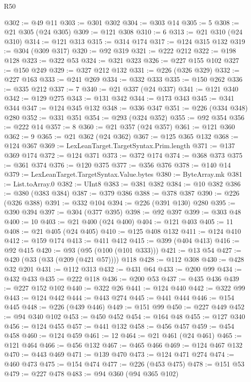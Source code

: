 \begin{lexlean}{R50}
\begin{coremodule}
@302 := @49 @11
@303 := @301 @302
@304 := @303 @14
@305 := 5
@308 := @21 @305 (@24 @305)
@309 := @121 @308
@310 := 6
@313 := @21 @310 (@24 @310)
@314 := @121 @313
@315 := @314 @174
@317 := @124 @315 @132
@319 := @304 (@309 @317)
@320 := @92 @319
@321 := @222 @212
@322 := @198 @128
@323 := @322 @53
@324 := @321 @323
@326 := @227 @155 @102
@327 := @150 @249
@329 := @327 @212 @132
@331 := @226 (@326 @329)
@332 := @227 @163
@333 := @241 @269
@334 := @332 @333
@335 := @150 @262
@336 := @335 @212
@337 := 7
@340 := @21 @337 (@24 @337)
@341 := @121 @340
@342 := @129 @275
@343 := @131 @342
@344 := @173 @343
@345 := @341 @344
@347 := @124 @345 @132
@348 := @336 @347
@351 := @226 (@334 @348) @280
@352 := @331 @351
@354 := @293 (@324 @352)
@355 := @92 @354
@356 := @222 @14
@357 := 8
@360 := @21 @357 (@24 @357)
@361 := @121 @360
@362 := 9
@365 := @21 @362 (@24 @362)
@367 := @125 @365 @132
@368 := @124 @367
@369 := LexLeanTarget.TargetSyntax.Prim.length
@371 := @137 @369 @174
@372 := @124 @371
@373 := @372 @174
@374 := @368 @373
@375 := @361 @374
@376 := @120 @375
@377 := @356 @376
@378 := @140 @14
@379 := LexLeanTarget.TargetSyntax.Value.bytes
@380 := ByteArray.mk
@381 := List.toArray.{0}
@382 := UInt8
@383 := @381 @382
@384 := @10 @382
@386 := @380 (@383 @384)
@387 := @379 @386
@388 := @378 @387
@390 := @226 (@326 @388)
@391 := @332 @104
@394 := @226 (@391 @130) @280
@395 := @390 @394
@397 := @304 (@377 @395)
@398 := @92 @397
@399 := @303 @48
@400 := 10
@403 := @21 @400 (@24 @400)
@404 := @121 @403
@405 := 11
@408 := @21 @405 (@24 @405)
@410 := @125 @408 @132
@411 := @124 @410
@412 := @159 @174
@413 := @411 @412
@415 := @399 (@404 @413)
@416 := @92 @415
@420 := @93 (@95 (@100 (@101 @333)))
@421 := @13 @54
@427 := @420 (@33 (@33 (@209 (@421 @57)))) @118
@428 := @112 @308
@430 := @428 @32 @201
@431 := @112 @313
@432 := @431 @64
@433 := @200 @99
@434 := @432 @433
@435 := @222 @118
@436 := @200 @53
@437 := @435 @436
@439 := @227 @152 @102
@440 := @322 @26
@441 := @124 @440
@442 := @322 @99
@443 := @124 @442
@444 := @443 @274
@445 := @441 @444
@446 := @154 @445
@448 := @226 (@439 @446)
@449 := @151 @99
@450 := @227 @449
@452 := @94 @340 @102
@453 := @450 @452
@454 := @164 @48
@455 := @127 @340
@456 := @124 @455
@457 := @441 @132
@458 := @456 @457
@459 := @454 @458
@460 := @124 @459
@461 := 12
@464 := @21 @461 (@24 @461)
@465 := @121 @464
@466 := @456 @132
@467 := @465 @466
@469 := @124 @467 @132
@470 := @443 @469
@471 := @139 @470
@473 := @124 @471 @274
@474 := @460 @473
@475 := @154 @474
@477 := @226 (@453 @475)
@478 := @151 @53
@479 := @227 @478
@483 := @94 @360 (@94 @365 @102)

\end{coremodule}
\end{lexlean}

